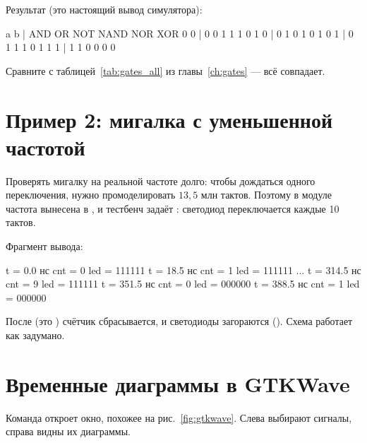Результат (это настоящий вывод симулятора):
\begin{vcode}[text]
 a b | AND OR NOT NAND NOR XOR
 0 0 |  0   0   1    1    1   0
 1 0 |  0   1   0    1    0   1
 0 1 |  0   1   1    1    0   1
 1 1 |  1   1   0    0    0   0
\end{vcode}

Сравните с таблицей~\ref{tab:gates_all} из главы~\ref{ch:gates} --- всё совпадает.

\section{Пример 2: мигалка с уменьшенной частотой}

Проверять мигалку на реальной частоте долго: чтобы дождаться одного
переключения, нужно промоделировать $13{,}5$ млн тактов. Поэтому в модуле
 частота вынесена в , и тестбенч задаёт
: светодиод переключается каждые 10 тактов.


Фрагмент вывода:
\begin{vcode}[text]
t =    0.0 нс  cnt =  0  led = 111111
t =   18.5 нс  cnt =  1  led = 111111
...
t =  314.5 нс  cnt =  9  led = 111111
t =  351.5 нс  cnt =  0  led = 000000
t =  388.5 нс  cnt =  1  led = 000000
\end{vcode}

После  (это ) счётчик сбрасывается, и
светодиоды загораются (). Схема работает как задумано.

\section{Временные диаграммы в GTKWave}

Команда  откроет окно, похожее на
рис.~\ref{fig:gtkwave}. Слева выбирают сигналы, справа видны их диаграммы.

